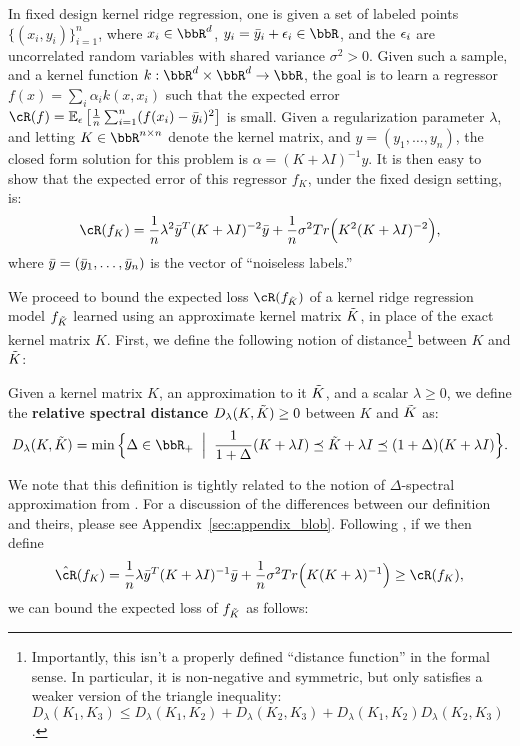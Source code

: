 In fixed design kernel ridge regression, one is given a set of labeled points $\{(x_i,y_i)\}_{i=1}^n$, where $x_i \in \RR^d$, $y_i = \by_i + \eps_i \in \RR$, and the $\epsilon_i$ are uncorrelated random variables with shared variance $\sigma^2 > 0$. Given such a sample, and a kernel function $k:\RR^d\times\RR^d\rightarrow \RR$, the goal is to learn a regressor $f(x) = \sum_i \alpha_i k(x,x_i)$ such that the expected error $\cR(f) = \expect{\eps}{\frac{1}{n}\sum_{i=1}^n (f(x_i) - \by_i)^2}$ is small. Given a regularization parameter $\lambda$, and letting $K\in\RR^{n\times n}$ denote the kernel matrix, and $y = (y_1,\ldots,y_n)$, the closed form solution for this problem is $\alpha = (K+\lambda I)^{-1}y$. It is then easy to show \citep{alaoui15} that the expected error of this regressor $f_K$, under the fixed design setting, is:
\begin{eqnarray}
\cR(f_K) = \frac{1}{n}\lambda^2 \by^T(K+\lambda I)^{-2}\by + \frac{1}{n}\sigma^2 Tr\Big(K^2(K+\lambda \id)^{-2}\Big),
\end{eqnarray}
where $\bar{y} = (\bar{y}_1,\ldots,\bar{y}_n)$ is the vector of ``noiseless labels.''

We proceed to bound the expected loss $\cR(f_{\tK})$ of a kernel ridge regression model $f_{\tilde{K}}$ learned using an approximate kernel matrix $\tilde{K}$, in place of the exact kernel matrix $K$. First, we define the following notion of distance\footnote{Importantly, this isn't a properly defined ``distance function'' in the formal sense.  In particular, it is non-negative and symmetric, but only satisfies a weaker version of the triangle inequality: $D_{\lambda}(K_1,K_3) \leq D_{\lambda}(K_1,K_2) + D_{\lambda}(K_2,K_3) + D_{\lambda}(K_1,K_2)D_{\lambda}(K_2,K_3)$.} between $K$ and $\tilde{K}$:

\begin{definition}
	\label{def:specdist}
	Given a kernel matrix $K$, an approximation to it $\tilde{K}$, and a scalar $\lambda \geq 0$, we define the \textbf{relative spectral distance} $D_{\lambda}(K,\tilde{K})\geq 0$ between $K$ and $\tilde{K}$ as:
	$$D_{\lambda}(K,\tK) = \min \Big\{\Delta \in \RR_{+} \;\;\Big|\;\; \frac{1}{1+\Delta}(K+\lambda I) \preceq \tK + \lambda I \preceq (1+\Delta)(K+\lambda I)\Big\}.$$
\end{definition}

We note that this definition is tightly related to the notion of $\Delta$-spectral approximation from \citet{avron17}.  For a discussion of the differences between our definition and theirs, please see Appendix~\ref{sec:appendix_blob}. Following \citet{avron17}, if we then define 
$$\hcR(f_K) = \frac{1}{n}\lambda \by^T(K+\lambda I)^{-1}\by + \frac{1}{n}\sigma^2 Tr\Big(K(K+\lambda)^{-1}\Big) \geq \cR(f_K),$$ 
we can bound the expected loss of $f_{\tilde{K}}$ as follows:

